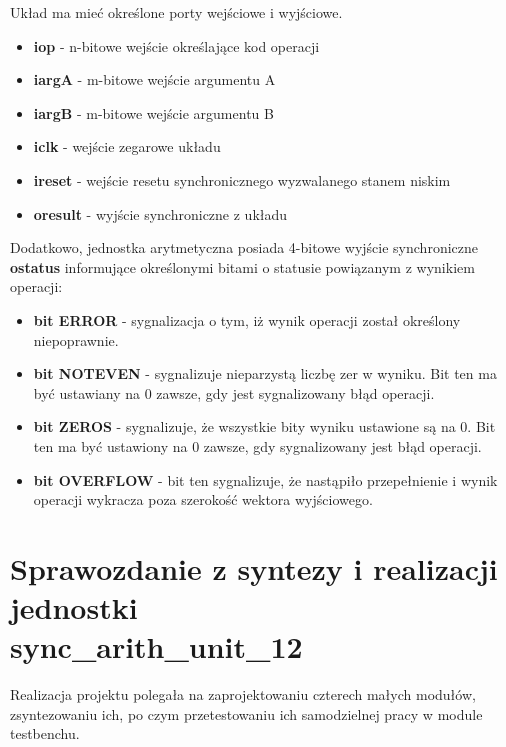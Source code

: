 \documentclass[12pt]{article}
\begin{document}
Układ ma mieć określone porty wejściowe i wyjściowe.
\begin{itemize}
  \item \textbf{i\textunderscore op} - n-bitowe wejście określające kod operacji
  \item \textbf{i\textunderscore arg\textunderscore A} - m-bitowe wejście argumentu A
  \item \textbf{i\textunderscore arg\textunderscore B} - m-bitowe wejście argumentu B
  \item \textbf{i\textunderscore clk} - wejście zegarowe układu
  \item \textbf{i\textunderscore reset} - wejście resetu synchronicznego wyzwalanego stanem niskim
  \item \textbf{o\textunderscore result} - wyjście synchroniczne z układu
\end{itemize}
Dodatkowo, jednostka arytmetyczna posiada 4-bitowe wyjście   synchroniczne \textbf{o\textunderscore status}
informujące określonymi bitami o statusie powiązanym z wynikiem operacji:

\begin{itemize}
  \item \textbf{bit ERROR} - sygnalizacja o tym, iż wynik operacji został określony niepoprawnie.
  \item \textbf{bit NOT\textunderscore  EVEN} - sygnalizuje nieparzystą liczbę zer w wyniku.
  Bit ten ma być ustawiany na 0 zawsze, gdy jest sygnalizowany błąd operacji.
  \item \textbf{bit ZEROS} - sygnalizuje, że wszystkie bity wyniku ustawione są na 0. Bit ten ma być
  ustawiony na 0 zawsze, gdy sygnalizowany jest błąd operacji.
  \item \textbf{bit OVERFLOW} - bit ten sygnalizuje, że nastąpiło przepełnienie i wynik 
  operacji wykracza poza szerokość wektora wyjściowego.
\end{itemize}

\section{Sprawozdanie z syntezy i realizacji jednostki 
\\ \textbf{sync\_arith\_unit\_12} }


Realizacja projektu polegała na zaprojektowaniu czterech małych modułów, 
zsyntezowaniu ich, po czym przetestowaniu ich samodzielnej pracy w module testbenchu.
\end{document}
